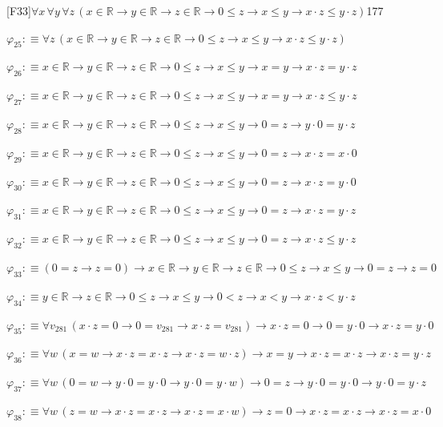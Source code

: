 \begin{fullproof}{[F33]}{$\forall x\,\forall y\,\forall z\,(x \in \mathbb{R} \to y \in \mathbb{R} \to z \in \mathbb{R} \to 0 \leq z \to x \leq y \to x \cdot z \leq y \cdot z)$}{177}
\begin{abbrevlist}
\item $\varphi_{25} :\equiv \forall z\,(x \in \mathbb{R} \to y \in \mathbb{R} \to z \in \mathbb{R} \to 0 \leq z \to x \leq y \to x \cdot z \leq y \cdot z)$
\item $\varphi_{26} :\equiv x \in \mathbb{R} \to y \in \mathbb{R} \to z \in \mathbb{R} \to 0 \leq z \to x \leq y \to x = y \to x \cdot z = y \cdot z$
\item $\varphi_{27} :\equiv x \in \mathbb{R} \to y \in \mathbb{R} \to z \in \mathbb{R} \to 0 \leq z \to x \leq y \to x = y \to x \cdot z \leq y \cdot z$
\item $\varphi_{28} :\equiv x \in \mathbb{R} \to y \in \mathbb{R} \to z \in \mathbb{R} \to 0 \leq z \to x \leq y \to 0 = z \to y \cdot 0 = y \cdot z$
\item $\varphi_{29} :\equiv x \in \mathbb{R} \to y \in \mathbb{R} \to z \in \mathbb{R} \to 0 \leq z \to x \leq y \to 0 = z \to x \cdot z = x \cdot 0$
\item $\varphi_{30} :\equiv x \in \mathbb{R} \to y \in \mathbb{R} \to z \in \mathbb{R} \to 0 \leq z \to x \leq y \to 0 = z \to x \cdot z = y \cdot 0$
\item $\varphi_{31} :\equiv x \in \mathbb{R} \to y \in \mathbb{R} \to z \in \mathbb{R} \to 0 \leq z \to x \leq y \to 0 = z \to x \cdot z = y \cdot z$
\item $\varphi_{32} :\equiv x \in \mathbb{R} \to y \in \mathbb{R} \to z \in \mathbb{R} \to 0 \leq z \to x \leq y \to 0 = z \to x \cdot z \leq y \cdot z$
\item $\varphi_{33} :\equiv (0 = z \to z = 0) \to x \in \mathbb{R} \to y \in \mathbb{R} \to z \in \mathbb{R} \to 0 \leq z \to x \leq y \to 0 = z \to z = 0$
\item $\varphi_{34} :\equiv y \in \mathbb{R} \to z \in \mathbb{R} \to 0 \leq z \to x \leq y \to 0 < z \to x < y \to x \cdot z < y \cdot z$
\item $\varphi_{35} :\equiv \forall v_{281}\,(x \cdot z = 0 \to 0 = v_{281} \to x \cdot z = v_{281}) \to x \cdot z = 0 \to 0 = y \cdot 0 \to x \cdot z = y \cdot 0$
\item $\varphi_{36} :\equiv \forall w\,(x = w \to x \cdot z = x \cdot z \to x \cdot z = w \cdot z) \to x = y \to x \cdot z = x \cdot z \to x \cdot z = y \cdot z$
\item $\varphi_{37} :\equiv \forall w\,(0 = w \to y \cdot 0 = y \cdot 0 \to y \cdot 0 = y \cdot w) \to 0 = z \to y \cdot 0 = y \cdot 0 \to y \cdot 0 = y \cdot z$
\item $\varphi_{38} :\equiv \forall w\,(z = w \to x \cdot z = x \cdot z \to x \cdot z = x \cdot w) \to z = 0 \to x \cdot z = x \cdot z \to x \cdot z = x \cdot 0$

\end{abbrevlist}
\end{fullproof}
